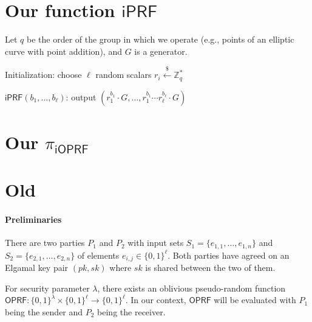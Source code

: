 \documentclass{article}
\newcommand{\oprf}[0]{\mathsf{OPRF}}
\newcommand{\getr}[0]{\stackrel{\$}{\leftarrow}}
\newcommand{\ioprf}[0]{\mathsf{i}\mathsf{OPRF}}
\newcommand{\iprf}[0]{\mathsf{i}\mathsf{PRF}}
\newcommand{\proto}[0]{{\pi_{\ioprf}}}
\newcommand{\Z}[0]{\mathbb{Z}}
\begin{document}
\section{Our function $\iprf$}
Let $q$ be the order of the group in which we operate (e.g., points of
an elliptic curve with point addition), and $G$ is a generator.

Initialization: choose $\ell$ random scalars $r_i\getr\Z^*_q$

$\iprf(b_1,\ldots,b_\ell)$: output 
$({r_1^{b_1}}\cdot{}G,\ldots,{r_1^{b_1}\cdots{}r_\ell^{b_\ell}}\cdot{}G)$

\section{Our $\proto$}



\newpage

\section{Old}
\paragraph{Preliminaries} There are two parties $P_1$ and $P_2$ with
input sets $S_1=\{e_{1,1},\ldots,e_{1,n}\}$ and
$S_2=\{e_{2,1},\ldots,e_{2,n}\}$ of elements
$e_{i,j}\in\{0,1\}^\ell$. Both parties have agreed on an Elgamal key
pair $(pk,sk)$ where $sk$ is shared between the two of them.

For security parameter $\lambda$, there exists an oblivious
pseudo-random function
$\oprf:\{0,1\}^\lambda\times\{0,1\}^\ell\rightarrow{}\{0,1\}^\ell$.
In our context, $\oprf$ will be evaluated with $P_1$ being the sender
and $P_2$ being the receiver.
\end{document}

